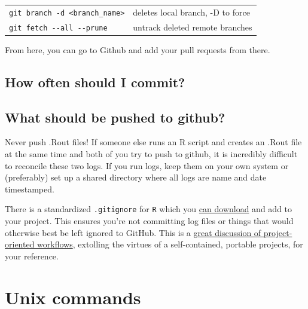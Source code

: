 \documentclass[]{book}
\begin{document}
\begin{longtable}[]{@{}ll@{}}
\begin{minipage}[t]{0.77\columnwidth}
\texttt{git\ branch\ -d\ \textless{}branch\_name\textgreater{}}\strut
\end{minipage} & \begin{minipage}[t]{0.17\columnwidth}\raggedright
deletes local branch, -D to force\strut
\end{minipage}\tabularnewline
\begin{minipage}[t]{0.77\columnwidth}\raggedright
\texttt{git\ fetch\ -\/-all\ -\/-prune}\strut
\end{minipage} & \begin{minipage}[t]{0.17\columnwidth}\raggedright
untrack deleted remote branches\strut
\end{minipage}\tabularnewline
\bottomrule
\end{longtable}

From here, you can go to Github and add your pull requests from there.

\hypertarget{how-often-should-i-commit}{%
\section{How often should I commit?}\label{how-often-should-i-commit}}

\hypertarget{what-should-be-pushed-to-github}{%
\section{What should be pushed to github?}\label{what-should-be-pushed-to-github}}

Never push .Rout files! If someone else runs an R script and creates an .Rout file at the same time and both of you try to push to github, it is incredibly difficult to reconcile these two logs. If you run logs, keep them on your own system or (preferably) set up a shared directory where all logs are name and date timestamped.

There is a standardized \texttt{.gitignore} for \texttt{R} which you \href{https://github.com/github/gitignore/blob/master/R.gitignore}{can download} and add to your project. This ensures you're not committing log files or things that would otherwise best be left ignored to GitHub. This is a \href{https://www.tidyverse.org/articles/2017/12/workflow-vs-script/}{great discussion of project-oriented workflows}, extolling the virtues of a self-contained, portable projects, for your reference.

\hypertarget{unix}{%
\chapter{Unix commands}\label{unix}}
\end{document}

